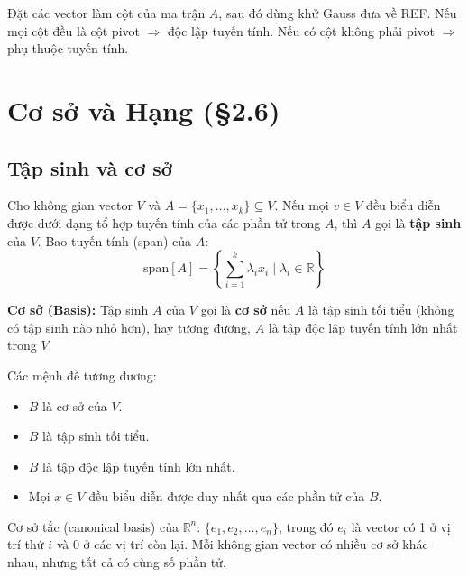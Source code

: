 \documentclass[12pt,a4paper]{article}
\begin{document}
\begin{phuongphap}[title={Kiểm tra độc lập tuyến tính}]
Đặt các vector làm cột của ma trận $A$, sau đó dùng khử Gauss đưa về REF. Nếu mọi cột đều là cột pivot $\Rightarrow$ độc lập tuyến tính. Nếu có cột không phải pivot $\Rightarrow$ phụ thuộc tuyến tính.
\end{phuongphap}

\section{Cơ sở và Hạng (§2.6)}

\subsection{Tập sinh và cơ sở}

\begin{dinhnghia}
Cho không gian vector $V$ và $A = \{x_1, \ldots, x_k\} \subseteq V$. Nếu mọi $v \in V$ đều biểu diễn được dưới dạng tổ hợp tuyến tính của các phần tử trong $A$, thì $A$ gọi là \textbf{tập sinh} của $V$. Bao tuyến tính (span) của $A$:
\[
  \mathrm{span}[A] = \left\{\sum_{i=1}^k \lambda_i x_i \;\Big|\; \lambda_i \in \mathbb{R}\right\}
\]
\end{dinhnghia}

\begin{dinhnghia}
\textbf{Cơ sở (Basis):} Tập sinh $A$ của $V$ gọi là \textbf{cơ sở} nếu $A$ là tập sinh tối tiểu (không có tập sinh nào nhỏ hơn), hay tương đương, $A$ là tập độc lập tuyến tính lớn nhất trong $V$.
\end{dinhnghia}

\begin{dinhly}
Các mệnh đề tương đương:
\begin{itemize}
  \item $B$ là cơ sở của $V$.
  \item $B$ là tập sinh tối tiểu.
  \item $B$ là tập độc lập tuyến tính lớn nhất.
  \item Mọi $x \in V$ đều biểu diễn được duy nhất qua các phần tử của $B$.
\end{itemize}
\end{dinhly}

\begin{luuy}
Cơ sở tắc (canonical basis) của $\mathbb{R}^n$: $\{e_1, e_2, \ldots, e_n\}$, trong đó $e_i$ là vector có 1 ở vị trí thứ $i$ và 0 ở các vị trí còn lại. Mỗi không gian vector có nhiều cơ sở khác nhau, nhưng tất cả có cùng số phần tử.
\end{luuy}
\end{document}

